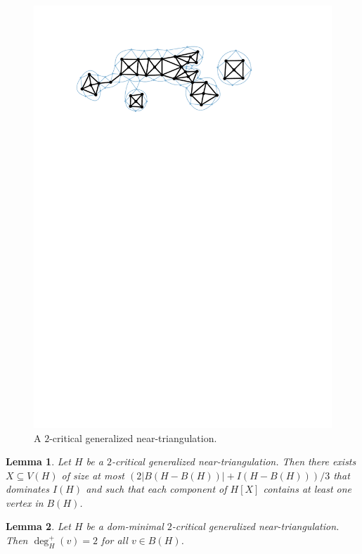 \documentclass{article}
\newtheorem{lem}{Lemma}
\theoremstyle{definition}
\begin{document}
\begin{figure}
  \centering
  \includegraphics[page=1]{figs/two_critical}
  \caption{A $2$-critical generalized near-triangulation.}
  \label{two_critical_figure}
\end{figure}


\begin{lem}\label{two_critical_handler}
  Let $H$ be a $2$-critical generalized near-triangulation.  Then there exists $X\subseteq V(H)$ of size at most $(2|B(H-B(H))| + I(H-B(H)))/3$ that dominates $I(H)$ and such that each component of $H[X]$ contains at least one vertex in $B(H)$.
\end{lem}


\begin{lem}
  Let $H$ be a dom-minimal $2$-critical generalized near-triangulation.  Then $\deg^+_H(v)=2$ for all $v\in B(H)$.
\end{lem}
\end{document}
